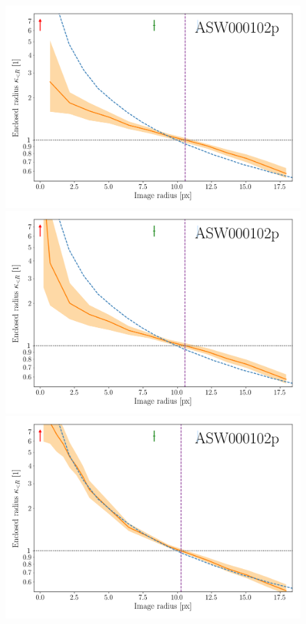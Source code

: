 \begin{figure}
  \includegraphics[width=.9\linewidth]{img/hires_comparison/ASW000102p_6941_11_hires_comparison}\\
  \includegraphics[width=.9\linewidth]{img/hires_comparison/ASW000102p_6941_13_hires_comparison}\\
  \includegraphics[width=.9\linewidth]{img/hires_comparison/ASW000102p_6941_33_hires_comparison}

\end{figure}
